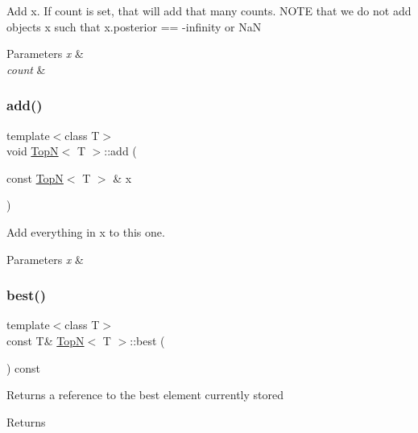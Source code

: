 Add x. If count is set, that will add that many counts. N\+O\+TE that we do not add objects x such that x.\+posterior == -\/infinity or NaN 
\begin{DoxyParams}{Parameters}
{\em x} & \\
\hline
{\em count} & \\
\hline
\end{DoxyParams}
\mbox{\label{class_top_n_a09be6a8873eef07ea3993e9fe7b6c71d}} 
\subsubsection{\texorpdfstring{add()}{add()}\hspace{0.1cm}{\footnotesize\ttfamily [2/2]}}
{\footnotesize\ttfamily template$<$class T$>$ \\
void \hyperlink{class_top_n}{TopN}$<$ T $>$\+::add (\begin{DoxyParamCaption}\item[{const \hyperlink{class_top_n}{TopN}$<$ T $>$ \&}]{x }\end{DoxyParamCaption})\hspace{0.3cm}{\ttfamily [inline]}}

Add everything in x to this one. 
\begin{DoxyParams}{Parameters}
{\em x} & \\
\hline
\end{DoxyParams}
\mbox{\label{class_top_n_a071e232087705b131627bd8a805d217c}} 
\subsubsection{\texorpdfstring{best()}{best()}}
{\footnotesize\ttfamily template$<$class T$>$ \\
const T\& \hyperlink{class_top_n}{TopN}$<$ T $>$\+::best (\begin{DoxyParamCaption}{ }\end{DoxyParamCaption}) const\hspace{0.3cm}{\ttfamily [inline]}}

Returns a reference to the best element currently stored \begin{DoxyReturn}{Returns}

\end{DoxyReturn}
\mbox{\label{class_top_n_a1867a08e8be4ffca2f3b6ea8161caa96}} 
